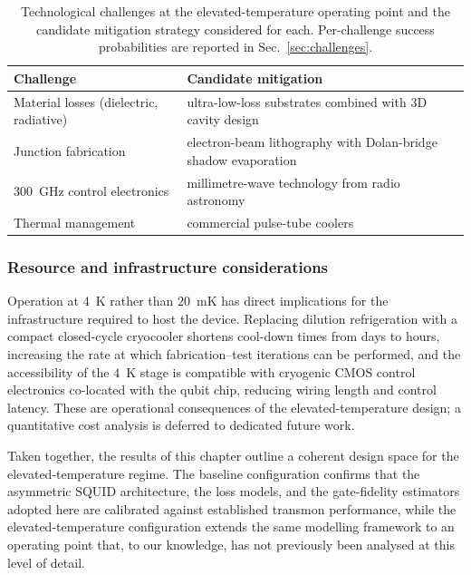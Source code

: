 \begin{table}[h]
\centering
\small
\begin{tabularx}{\linewidth}{@{}l L@{}}
\toprule
\textbf{Challenge} & \textbf{Candidate mitigation} \\
\midrule
Material losses (dielectric, radiative) & ultra-low-loss substrates combined with 3D cavity design \\
Junction fabrication                    & electron-beam lithography with Dolan-bridge shadow evaporation \\
$300$~GHz control electronics           & millimetre-wave technology from radio astronomy \\
Thermal management                      & commercial pulse-tube coolers \\
\bottomrule
\end{tabularx}
\caption{Technological challenges at the elevated-temperature operating point and the candidate mitigation strategy considered for each. Per-challenge success probabilities are reported in Sec.~\ref{sec:challenges}.}
\label{tab:tech_challenges_addressable}
\end{table}

\subsubsection*{Resource and infrastructure considerations}

Operation at $4$~K rather than $20$~mK has direct implications for the infrastructure required to host the device. Replacing dilution refrigeration with a compact closed-cycle cryocooler shortens cool-down times from days to hours, increasing the rate at which fabrication--test iterations can be performed, and the accessibility of the $4$~K stage is compatible with cryogenic CMOS control electronics co-located with the qubit chip, reducing wiring length and control latency. These are operational consequences of the elevated-temperature design; a quantitative cost analysis is deferred to dedicated future work.

Taken together, the results of this chapter outline a coherent design space for the elevated-temperature regime. The baseline configuration confirms that the asymmetric SQUID architecture, the loss models, and the gate-fidelity estimators adopted here are calibrated against established transmon performance, while the elevated-temperature configuration extends the same modelling framework to an operating point that, to our knowledge, has not previously been analysed at this level of detail.

